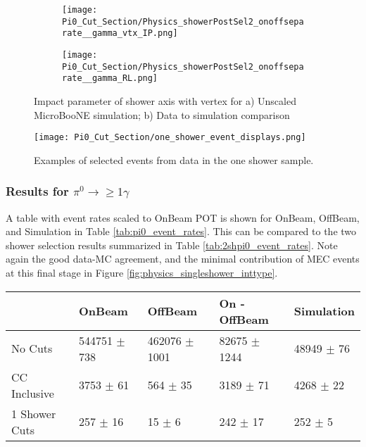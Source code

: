 \begin{figure}[H]
  \begin{subfigure}[t]{0.35\textwidth}
\texttt{[image: Pi0\_Cut\_Section/Physics\_showerPostSel2\_onoffseparate\_\_gamma\_vtx\_IP.png]}
  \caption{ }
  \end{subfigure} 
  \hspace{9mm}
  \begin{subfigure}[t]{0.35\textwidth}
\texttt{[image: Pi0\_Cut\_Section/Physics\_showerPostSel2\_onoffseparate\_\_gamma\_RL.png]}
  \caption{ }
  \end{subfigure} 
\caption{ Impact parameter of shower axis with vertex for a) Unscaled MicroBooNE simulation; b) Data to simulation comparison }
\label{fig:cutjust_pi0_1shower_IP}
\end{figure}

\begin{figure}[H]
    \centering
\texttt{[image: Pi0\_Cut\_Section/one\_shower\_event\_displays.png]}
\caption{ Examples of selected events from data in the one shower sample.}
\label{fig:one_shower_event_displays}
\end{figure}



\subsubsection{Results for $\pi^0\rightarrow \geq 1\gamma$}
\par A table with event rates scaled to OnBeam POT is shown for OnBeam, OffBeam, and Simulation in Table \ref{tab:pi0_event_rates}. This can be compared to the two shower selection results summarized in Table \ref{tab:2shpi0_event_rates}. Note again the good data-MC agreement, and the minimal contribution of MEC events at this final stage in Figure \ref{fig:physics_singleshower_inttype}.

\begin{table}[H] 
 \centering
 \begin{tabular}{| l | l | l | l | l |}
  \hline
   & OnBeam & OffBeam & On - OffBeam & Simulation \\ [0.1ex] \hline
No Cuts & 544751 $\pm$ 738 & 462076 $\pm$ 1001 & 82675 $\pm$ 1244 & 48949 $\pm$ 76 \\ 
CC Inclusive & 3753 $\pm$ 61 & 564 $\pm$ 35  & 3189 $\pm$ 71 & 4268 $\pm$ 22  \\ 
1 Shower Cuts & 257 $\pm$ 16 & 15 $\pm$ 6 & 242 $\pm$ 17 & 252 $\pm$ 5  \\ \hline
\end{tabular}
 \end{table}


